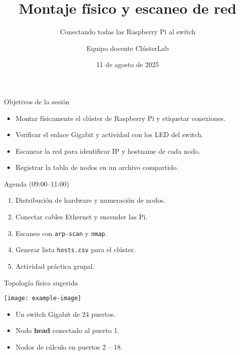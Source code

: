 \documentclass[aspectratio=169,professionalfonts]{beamer}
\title[ClústerLab • Día 4]{Montaje físico y escaneo de red}
\subtitle{Conectando todas las Raspberry Pi al switch}
\author{Equipo docente ClústerLab}
\date{11 de agosto de 2025}
\begin{document}
\begin{frame}[plain]
  \titlepage
\end{frame}

\begin{frame}[fragile]{Objetivos de la sesión}
  \begin{itemize}
    \item Montar físicamente el clúster de Raspberry Pi y etiquetar conexiones.
    \item Verificar el enlace Gigabit y actividad con los LED del switch.
    \item Escanear la red para identificar IP y hostname de cada nodo.
    \item Registrar la tabla de nodos en un archivo compartido.
  \end{itemize}
\end{frame}

\begin{frame}[fragile]{Agenda (09:00--11:00)}
  \begin{enumerate}
    \item Distribución de hardware y numeración de nodos.
    \item Conectar cables Ethernet y encender las Pi.
    \item Escaneo con \texttt{arp-scan} y \texttt{nmap}.
    \item Generar lista \texttt{hosts.csv} para el clúster.
    \item Actividad práctica grupal.
  \end{enumerate}
\end{frame}

\begin{frame}[fragile]{Topología física sugerida}
  \begin{center}
    \texttt{[image: example-image]} %
  \end{center}
  \begin{itemize}
    \item Un switch Gigabit de 24 puertos.
    \item Nodo \textbf{head} conectado al puerto 1.
    \item Nodos de cálculo en puertos 2 -- 18.
  \end{itemize}
\end{frame}
\end{document}
